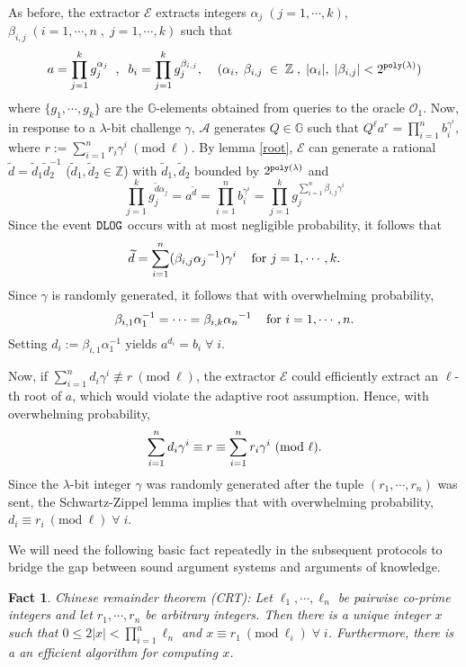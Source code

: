 \documentclass[11pt, lettersize, notitlepage, leqno, footskip=0.6cm]{article}
\newcommand{\bz}{\mathbb Z}
\newcommand{\pl}{\prod\limits}
\newcommand{\slim}{\sum\limits}
\newcommand{\ttt}{\texttt}
\newcommand{\bG}{\mathbb{G}}
\newcommand{\wti}{\widetilde}
\newcommand{\mc}{\mathcal}
\newcommand{\al}{\alpha}
\newcommand{\be}{\beta}
\newcommand{\lam}{\lambda}
\newcommand{\vs}{\vspace{-0.15cm}}
\newcommand{\noin}{\noindent}
\newcommand{\op}{overwhelming probability}
\newcommand{\np}{negligible probability}
\newcommand{\Mod}[1]{\ (\mathrm{mod}\ #1)}
\newcommand{\E}{\mc{E}}
\newtheorem{Fact}{Fact}[section]
\numberwithin{equation}{section}
\begin{document}
\begin{prf} As before, the extractor $\E$ extracts integers $\al_j\;(j=1,\cdots,k)$, $\be_{i,j}\;(i=1,\cdots, n\;,\;j= 1,\cdots,k)$ such that \vspace{-0.2cm} $$a = \pl_{j=1}^k g_j^{\al_j}\;\;,\;\; b_i = \pl_{j=1}^k g_j^{\be_{i,j}},\;\;\;\;(\al_i,\;\be_{i,j}\;\in\;\bz\;,\;|\al_i|,\;|\be_{i,j}| < 2^{\ttt{poly}(\lam)})\vs $$ where $\{g_1,\cdots,g_k\}$ are the $\bG$-elements obtained from queries to the oracle $\mc{O}_1$. Now, in response to a $\lam$-bit challenge $\gamma$, $\mc{A}$ generates $Q\in\bG$ such that $Q^{\ell}a^r = \pl_{i=1}^n b_i^{\gamma^i}, $ where $r:= \slim_{i=1}^n r_i{\gamma}^i\Mod{\ell}$. By lemma \ref{root}, $\E$ can generate a rational $\wti{d} = \wti{d}_1\wti{d}_2^{-1}$ ($\wti{d}_1, \wti{d}_2\in\bz$) with $\wti{d}_1, \wti{d}_2$ bounded by $2^{\tt{poly}(\lam)}$ and \vs $$\pl_{j=1}^k g_j^{\wti{d}\al_j} = a^{\wti{d}} = \pl_{i=1}^n b_i^{\gamma^i} = \pl_{j=1}^k g_j^{\slim_{i=1}^n \be_{i,j}\gamma^i}  $$ Since the event \hyperlink{DLOG}{$\tt{DLOG}$} occurs with at most \np, it follows that \vs $$ \wti{d} = \slim_{i=1}^n ({\be_{i,j}}{\al_j}^{-1})\gamma^i\;\;\;\text{ for } j = 1,\cdots, k. \vs $$ Since $\gamma$ is randomly generated, it follows that with \op, \vs $$\be_{i,1}\al_{1}^{-1} = \cdots =  \be_{i,k}{\al_{n}}^{-1}\;\;\;\text{ for } i = 1,\cdots, n. \vs $$ Setting $d_i:= \be_{i,1}\al_{1}^{-1}$ yields $a^{d_i} = b_i\;\forall\; i$.

Now, if $\slim_{i=1}^n d_i\gamma^i \not\equiv r\Mod{\ell}$, the extractor $\E$ could efficiently extract an $\ell$-th root of $a$, which would violate the adaptive root assumption. Hence, with \op, \vs $$\slim_{i=1}^n d_i\gamma^i \equiv r\equiv \slim_{i=1}^n r_i\gamma^i \Mod{\ell} \vs .$$ Since the $\lam$-bit integer $\gamma$ was randomly generated after the tuple $(r_1,\cdots,r_n)$ was sent, the Schwartz-Zippel lemma implies that with \op, $d_i\equiv r_i\Mod{\ell}\;\forall\; i$.\end{prf}

\noin We will need the following basic fact repeatedly in the subsequent protocols to bridge the gap between sound argument systems and arguments of knowledge.\vspace{0.1cm}

\begin{Fact}{\normalfont Chinese remainder theorem (CRT):} Let $\ell_1,\cdots,\ell_n$ be pairwise co-prime integers and let $r_1,\cdots,r_n$ be arbitrary integers. Then there is a unique integer $x$ such that $0\leq 2|x|< \prod_{i=1}^n \ell_n$ and $x\equiv r_1\Mod{\ell_i}\;\forall\;i$. Furthermore, there is a an efficient algorithm for computing $x$. \end{Fact}
\end{document}
